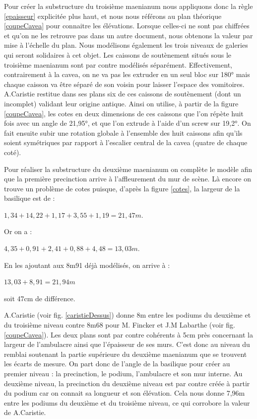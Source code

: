 Pour créer la substructure du troisième \gls{maenianum} nous appliquons donc la règle \ref{epaisseur} explicitée plus haut, et nous nous référons au plan théorique \ref{coupeCavea} pour connaitre les élévations. Lorsque celles-ci ne sont pas chiffrées et qu'on ne les retrouve pas dans un autre document, nous obtenons la valeur par mise à l'échelle du plan. Nous modélisons également les trois niveaux de galeries qui seront solidaires à cet objet. Les caissons de soutènement situés sous le troisième \gls{maenianum} sont par contre modélisés séparément. Effectivement, contrairement à la \gls{cavea}, on ne va pas les extruder en un seul bloc sur 180° mais chaque caisson va être séparé de son voisin pour laisser l'espace des vomitoires. A.Caristie restitue dans ses plans six de ces caissons de soutènement (dont un incomplet) validant leur origine antique. Ainsi on utilise, à partir de la figure \ref{coupeCavea}, les cotes en deux dimensions de ces caissons que l'on répète huit fois avec un angle de 21,95°, et que l'on extrude à l'aide d'un \gls{screw} sur 19,2°. On fait ensuite subir une rotation globale à l'ensemble des huit caissons afin qu'ils soient symétriques par rapport à l'escalier central de la \gls{cavea} (quatre de chaque coté). 

Pour réaliser la substructure du deuxième \gls{maenianum} on complète le modèle afin que la première \gls{precinction} arrive à l'affleurement du mur de scène. Là encore on trouve un problème de cotes puisque, d'après la figure \ref{cotes}, la largeur de la basilique est de :
\begin{center}
$1,34+14,22+1,17+3,55+1,19=21,47m$.
\end{center}
Or on a : 
\begin{center}
$4,35+0,91+2,41+0,88+4,48=13,03m$.
\end{center}
En les ajoutant aux 8m91 déjà modélisés, on arrive à :
\begin{center}
$13,03+8,91=21,94m$
\end{center}
soit 47cm de différence. 


A.Caristie (voir fig. \ref{caristieDessus}) donne 8m entre les  \glspl{podium} du deuxième et du troisième niveau contre 8m68 pour M. Fincker et J.M Labarthe (voir fig. \ref{coupeCavea}). Les deux plans sont par contre cohérents à 5cm près concernant la largeur de l'\gls{ambulacre} ainsi que l'épaisseur de ses murs. C'est donc au niveau du remblai soutenant la partie supérieure du deuxième \gls{maenianum} que se trouvent les écarts de mesure. On part donc de l'angle de la basilique pour créer au premier niveau : la \gls{precinction}, le \gls{podium}, l'\gls{ambulacre} et son mur interne. Au deuxième niveau, la \gls{precinction} du deuxième niveau est par contre créée à partir du  \gls{podium} car on connait sa longueur et son élévation. Cela nous donne 7,96m entre les \glspl{podium} du deuxième et du troisième niveau, ce qui corrobore la valeur de A.Caristie.

